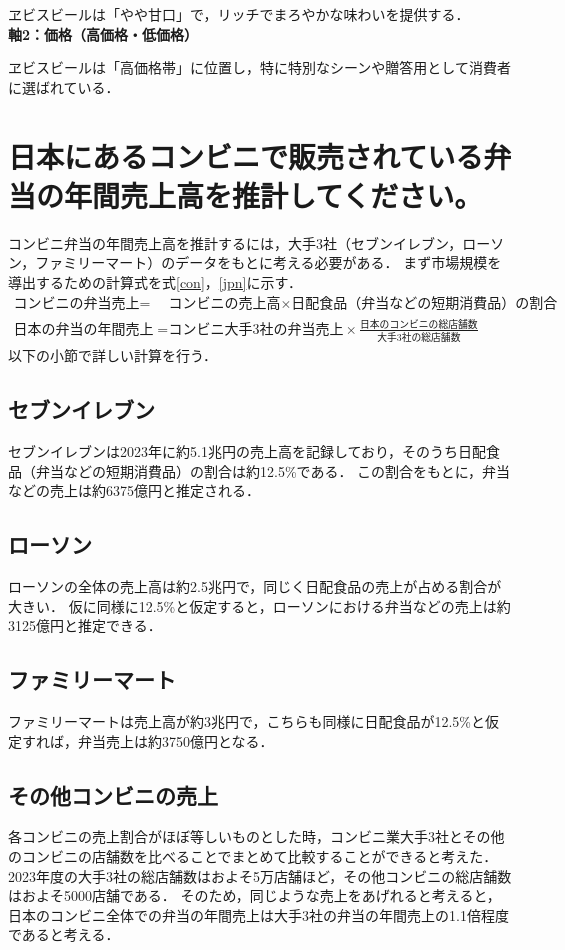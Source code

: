 \documentclass[titlepage,a4paper]{jsarticle}
\begin{document}
ヱビスビールは「やや甘口」で，リッチでまろやかな味わいを提供する．
\\\textbf{軸2：価格（高価格・低価格）}

ヱビスビールは「高価格帯」に位置し，特に特別なシーンや贈答用として消費者に選ばれている．

\section{日本にあるコンビニで販売されている弁当の年間売上高を推計してください。}
コンビニ弁当の年間売上高を推計するには，大手3社（セブンイレブン，ローソン，ファミリーマート）のデータをもとに考える必要がある．
まず市場規模を導出するための計算式を式\eqref{con}，\eqref{jpn}に示す．
\begin{align}
  \text{コンビニの弁当売上} =& \text{コンビニの売上高} \times \text{日配食品（弁当などの短期消費品）の割合}\label{con}\\
  \text{日本の弁当の年間売上高} =& \text{コンビニ大手3社の弁当売上} \times \frac{\text{日本のコンビニの総店舗数}}{\text{大手3社の総店舗数}}\label{jpn}
\end{align}
以下の小節で詳しい計算を行う．
 
\subsection{セブンイレブン}
セブンイレブンは2023年に約5.1兆円の売上高を記録しており，そのうち日配食品（弁当などの短期消費品）の割合は約12.5\%である\cite{711}．
この割合をもとに，弁当などの売上は約6375億円と推定される．

\subsection{ローソン}
ローソンの全体の売上高は約2.5兆円で，同じく日配食品の売上が占める割合が大きい．
仮に同様に12.5\%と仮定すると，ローソンにおける弁当などの売上は約3125億円と推定できる\cite{Lowson}．

\subsection{ファミリーマート}
ファミリーマートは売上高が約3兆円で，こちらも同様に日配食品が12.5\%と仮定すれば，弁当売上は約3750億円となる\cite{fam}．

\subsection{その他コンビニの売上}
各コンビニの売上割合がほぼ等しいものとした時，コンビニ業大手3社とその他のコンビニの店舗数を比べることでまとめて比較することができると考えた．
2023年度の大手3社の総店舗数はおよそ5万店舗ほど，その他コンビニの総店舗数はおよそ5000店舗である\cite{conven}．
そのため，同じような売上をあげれると考えると，日本のコンビニ全体での弁当の年間売上は大手3社の弁当の年間売上の1.1倍程度であると考える．
\end{document}
